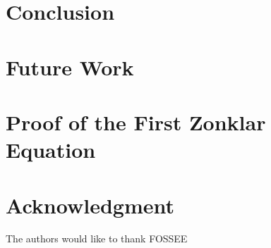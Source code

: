 \documentclass[conference]{IEEEtran}
\begin{document}
\section{Conclusion}
\blindtext

\section{Future Work}
\blindtext





%


\appendices
\section{Proof of the First Zonklar Equation}
\blindtext

\section*{Acknowledgment}


The authors would like to thank FOSSEE


\ifCLASSOPTIONcaptionsoff
  \newpage
\fi
\end{document}
